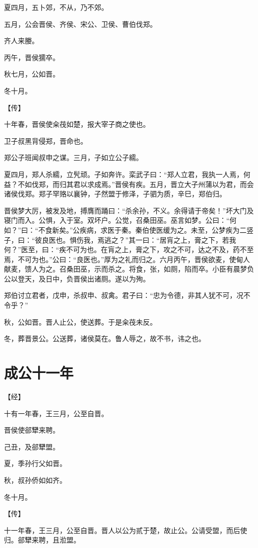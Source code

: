 \documentclass[a4paper,12pt,UTF8,twoside]{ctexbook}
\begin{document}
夏四月，五卜郊，不从，乃不郊。

五月，公会晋侯、齐侯、宋公、卫侯、曹伯伐郑。

齐人来媵。

丙午，晋侯獳卒。

秋七月，公如晋。

冬十月。

【传】

十年春，晋侯使籴茷如楚，报大宰子商之使也。

卫子叔黑背侵郑，晋命也。

郑公子班闻叔申之谋。三月，子如立公子繻。

夏四月，郑人杀繻，立髠顽。子如奔许。栾武子曰：“郑人立君，我执一人焉，何益？不如伐郑，而归其君以求成焉。”晋侯有疾。五月，晋立大子州蒲以为君，而会诸侯伐郑。郑子罕赂以襄钟，子然盟于修泽，子驷为质，辛巳，郑伯归。

晋侯梦大厉，被发及地，搏膺而踊曰：“杀余孙，不义。余得请于帝矣！”坏大门及寝门而入。公惧，入于室。双坏户。公觉，召桑田巫。巫言如梦。公曰：“何如？”曰：“不食新矣。”公疾病，求医于秦。秦伯使医缓为之。未至，公梦疾为二竖子，曰：“彼良医也。惧伤我，焉逃之？”其一曰：“居肓之上，膏之下，若我何？”医至，曰：“疾不可为也。在肓之上，膏之下，攻之不可，达之不及，药不至焉，不可为也。”公曰：“良医也。”厚为之礼而归之。六月丙午，晋侯欲麦，使甸人献麦，馈人为之。召桑田巫，示而杀之。将食，张，如厕，陷而卒。小臣有晨梦负公以登天，及日中，负晋侯出诸厕。遂以为殉。

郑伯讨立君者，戊申，杀叔申、叔禽。君子曰：“忠为令德，非其人犹不可，况不令乎？”

秋，公如晋。晋人止公，使送葬。于是籴茷未反。

冬，葬晋景公。公送葬，诸侯莫在。鲁人辱之，故不书，讳之也。


\chapter{成公十一年}



【经】

十有一年春，王三月，公至自晋。

晋侯使郤犫来聘。

己丑，及郤犫盟。

夏，季孙行父如晋。

秋，叔孙侨如如齐。

冬十月。

【传】

十一年春，王三月，公至自晋。晋人以公为贰于楚，故止公。公请受盟，而后使归。郤犫来聘，且涖盟。
\end{document}
